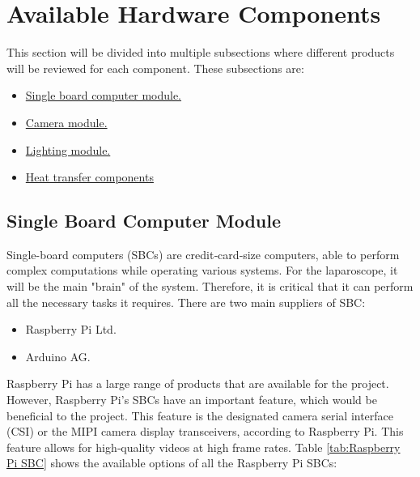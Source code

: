 \section{Available Hardware Components}
\label{sec:Available Hardware Components}

This section will be divided into multiple subsections where different products will be reviewed for each component. These subsections are:

\begin{itemize}
    \item \hyperref[sec:Main Microcontroller and Computer Module]{Single board computer module.}
    \item \hyperref[sec:Camera Module]{Camera module.}
    \item \hyperref[sec:Lighting Module]{Lighting module.}
    \item \hyperref[sec:Heat Components]{Heat transfer components}
\end{itemize}

\subsection{Single Board Computer Module}
\label{sec:Main Microcontroller and Computer Module}

 Single-board computers (SBCs) are credit‑card‑size computers, able to perform complex computations while operating various systems. For the laparoscope, it will be the main "brain" of the system. Therefore, it is critical that it can perform all the necessary tasks it requires. There are two main suppliers of SBC: 


\begin{itemize}
    \item Raspberry Pi Ltd.
    \item Arduino AG.
\end{itemize}

Raspberry Pi has a large range of products that are available for the project. However, Raspberry Pi’s SBCs have an important feature, which would be beneficial to the project. This feature is the designated camera serial interface (CSI) or the MIPI camera display transceivers, according to Raspberry Pi. This feature allows for high‑quality videos at high frame rates. \citep{RP-DOC} Table \ref{tab:Raspberry Pi SBC} shows the available options of all the Raspberry Pi SBCs:

